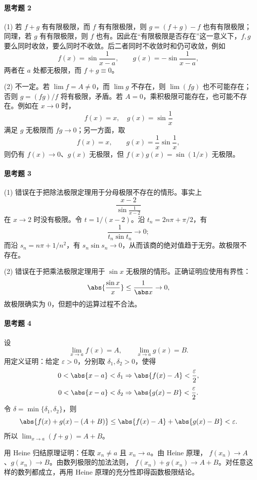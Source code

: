 \paragraph{思考题 2}
\begin{xsolution}
(1) 若 $f+g$ 有有限极限，而 $f$ 有有限极限，则
$g=(f+g)-f$ 也有有限极限；同理，若 $g$ 有有限极限，则 $f$ 也有。因此在“有限极限是否存在”这一意义下，$f,g$ 要么同时收敛，要么同时不收敛。后二者同时不收敛时和仍可收敛，例如
\[
  f(x)=\sin\frac1{x-a},\qquad g(x)=-\sin\frac1{x-a},
\]
两者在 $a$ 处都无极限，而 $f+g\equiv0$。

(2) 不一定。若 $\lim f=A\ne0$，而 $\lim g$ 不存在，则 $\lim(fg)$ 也不可能存在；否则
$g=(fg)/f$ 将有极限，矛盾。若 $A=0$，乘积极限可能存在，也可能不存在。例如在 $x\to0$ 时，
\[
  f(x)=x,\quad g(x)=\sin\frac1x
\]
满足 $g$ 无极限而 $fg\to0$；另一方面，取
\[
  f(x)=x,\qquad g(x)=\frac1x\sin\frac1x,
\]
则仍有 $f(x)\to0$、$g(x)$ 无极限，但 $f(x)g(x)=\sin(1/x)$ 无极限。
\end{xsolution}

\paragraph{思考题 3}
\begin{xsolution}
(1) 错误在于把除法极限定理用于分母极限不存在的情形。事实上
\[
  \frac{x-2}{\sin\frac1{x-2}}
\]
在 $x\to2$ 时没有极限。令 $t=1/(x-2)$。沿 $t_n=2n\pi+\pi/2$，有
\[
  \frac1{t_n\sin t_n}\to0;
\]
而沿 $s_n=n\pi+1/n^2$，有
$s_n\sin s_n\to0$，从而该商的绝对值趋于无穷。故极限不存在。

(2) 错误在于把乘法极限定理用于 $\sin x$ 无极限的情形。正确证明应使用有界性：
\[
  \abs{\frac{\sin x}{x}}\leq\frac1{\abs x}\to0,
\]
故极限确实为 0，但题中的运算过程不合法。
\end{xsolution}

\paragraph{思考题 4}
\begin{xsolution}
设
\[
  \lim_{x\to a}f(x)=A,\qquad \lim_{x\to a}g(x)=B.
\]
用定义证明：给定 $\varepsilon>0$，分别取 $\delta_1,\delta_2>0$，使得
\[
  0<\abs{x-a}<\delta_1\Rightarrow\abs{f(x)-A}<\frac\varepsilon2,
\]
\[
  0<\abs{x-a}<\delta_2\Rightarrow\abs{g(x)-B}<\frac\varepsilon2.
\]
令 $\delta=\min\{\delta_1,\delta_2\}$，则
\[
  \abs{f(x)+g(x)-(A+B)}
  \leq\abs{f(x)-A}+\abs{g(x)-B}<\varepsilon.
\]
所以 $\lim_{x\to a}(f+g)=A+B$。

用 Heine 归结原理证明：任取 $x_n\ne a$ 且 $x_n\to a$。由 Heine 原理，
$f(x_n)\to A$、$g(x_n)\to B$。由数列极限的加法法则，
$f(x_n)+g(x_n)\to A+B$。对任意这样的数列都成立，再用 Heine 原理的充分性即得函数极限结论。
\end{xsolution}

